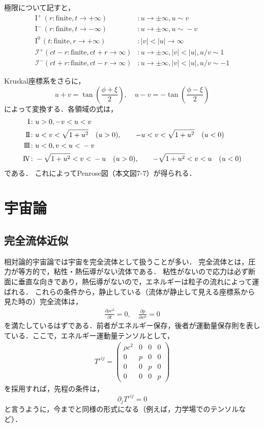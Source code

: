 \documentclass[a4paper]{ltjsreport}
\begin{document}
極限について記すと，
\begin{align*}
  \text{I}^ + \,(r\colon\text{finite},t\to + \infty) &\colon u\to\pm\infty,u\sim{}v\\
  \text{I}^ - \,(r\colon\text{finite},t\to - \infty) &\colon u\to\pm\infty,u\sim{} - v\\
  \text{I}^0\,(t\colon\text{finite},r\to + \infty) &\colon |v|<{}|u|\to\infty\\
  \mathscr{I}^ + (ct - r\colon\text{finite},ct + r\to\infty) &\colon u\to\pm\infty,|v|<{}|u|,u/v\sim1\\
  \mathscr{I}^ - (ct + r\colon\text{finite},ct - r\to\infty) &\colon u\to\pm\infty,|v|<{}|u|,u/v\sim - 1
\end{align*}

Kruskal座標系をさらに，
\[u + v=\tan\left(\frac{\phi + \xi}{2}\right),\quad{}u - v= - \tan\left(\frac{\phi - \xi}{2}\right)\]
によって変換する．各領域の式は，
\begin{align*}
  \text{I} &\colon u>0, - v<{}u<{}v\\
  \text{I}\hspace{ - .1em}\text{I} &\colon u<{}v<\sqrt{1 + u^2}\quad(u>0),\qquad - u<{}v<\sqrt{1 + u^2}\quad(u<{}0)\\
  \text{I}\hspace{ - .1em}\text{I}\hspace{ - .1em}\text{I} &\colon u<{}0,v<{}u<{} - v\\
  \text{I}\hspace{ - .1em}\text{V} &\colon  - \sqrt{1 + u^2}<{}v<{} - u\quad(u>0),\qquad - \sqrt{1 + u^2}<{}v<{}u\quad(u<{}0)
\end{align*}
である．
これによってPenrose図（本文図7-7）が得られる．

\chapter{宇宙論}
\section{完全流体近似}
相対論的宇宙論では宇宙を完全流体として扱うことが多い．
完全流体とは，圧力が等方的で，粘性・熱伝導がない流体である．
粘性がないので応力は必ず断面に垂直な向きであり，熱伝導がないので，エネルギーは粒子の流れによって運ばれる．
これらの条件から，静止している（流体が静止して見える座標系から見た時の）完全流体は，
\begin{align}
  \frac{\partial\rho{c^2}}{\partial{t}}=0,\quad\frac{\partial{p}}{\partial{x^{\mu}}}=0
\end{align}
を満たしているはずである．前者がエネルギー保存，後者が運動量保存則を表している．ここで，エネルギー運動量テンソルとして，
\begin{align}
  T'^{ij}=
  \begin{pmatrix}
    \rho{c^2} & 0 & 0 & 0\\
    0 & p & 0 & 0\\
    0 & 0 & p & 0\\
    0 & 0 & 0 & p
  \end{pmatrix}
\end{align}
を採用すれば，先程の条件は，
\[\partial_{j}T'^{ij}=0\]
と言うように，今までと同様の形式になる（例えば，力学場でのテンソルなど）．
\end{document}
